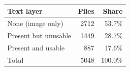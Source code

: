 \begin{tabular}{lrr}
\toprule
Text layer & Files & Share \\
\midrule
None (image only) & 2712 & 53.7\% \\
Present but unusable & 1449 & 28.7\% \\
Present and usable & 887 & 17.6\% \\
\midrule
Total & 5048 & 100.0\% \\
\bottomrule
\end{tabular}
